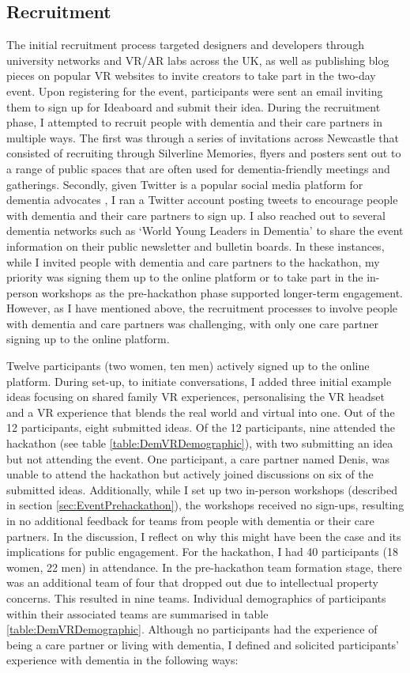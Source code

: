 \subsection{Recruitment}
\label{sec:EventRecruitment}
The initial recruitment process targeted designers and developers through university networks and VR/AR labs across the UK, as well as publishing blog pieces on popular VR websites to invite creators to take part in the two-day event. Upon registering for the event, participants were sent an email inviting them to sign up for Ideaboard and submit their idea. During the recruitment phase, I attempted to recruit people with dementia and their care partners in multiple ways. The first was through a series of invitations across Newcastle that consisted of recruiting through Silverline Memories, flyers and posters sent out to a range of public spaces that are often used for dementia-friendly meetings and gatherings. Secondly, given Twitter is a popular social media platform for dementia advocates \citep{talbot_how_2020}, I ran a Twitter account posting tweets to encourage people with dementia and their care partners to sign up. I also reached out to several dementia networks such as `World Young Leaders in Dementia' to share the event information on their public newsletter and bulletin boards. In these instances, while I invited people with dementia and care partners to the hackathon, my priority was signing them up to the online platform or to take part in the in-person workshops as the pre-hackathon phase supported longer-term engagement. However, as I have mentioned above, the recruitment processes to involve people with dementia and care partners was challenging, with only one care partner signing up to the online platform.

Twelve participants (two women, ten men) actively signed up to the online platform. During set-up, to initiate conversations, I added three initial example ideas focusing on shared family VR experiences, personalising the VR headset and a VR experience that blends the real world and virtual into one. Out of the 12 participants, eight submitted ideas. Of the 12 participants, nine attended the hackathon (see table \ref{table:DemVRDemographic}), with two submitting an idea but not attending the event. One participant, a care partner named Denis, was unable to attend the hackathon but actively joined discussions on six of the submitted ideas. Additionally, while I set up two in-person workshops (described in section \ref{sec:EventPrehackathon}), the workshops received no sign-ups, resulting in no additional feedback for teams from people with dementia or their care partners. In the discussion, I reflect on why this might have been the case and its implications for public engagement.
For the hackathon, I had 40 participants (18 women, 22 men) in attendance. In the pre-hackathon team formation stage, there was an additional team of four that dropped out due to intellectual property concerns. This resulted in nine teams. Individual demographics of participants within their associated teams are summarised in table \ref{table:DemVRDemographic}. Although no participants had the experience of being a care partner or living with dementia, I defined and solicited participants’ experience with dementia in the following ways:

